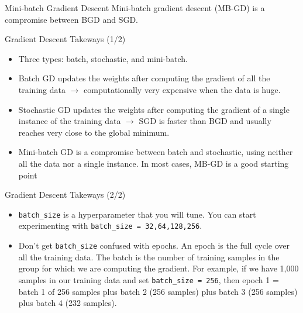 \documentclass{beamer}
\begin{document}
\begin{frame}{Mini-batch Gradient Descent}
	Mini-batch gradient descent (MB-GD) is a compromise between BGD and SGD.
\end{frame}

\begin{frame}{Gradient Descent Takeways (1/2)}
	\begin{itemize}
		\item<2-> Three types: batch, stochastic, and mini-batch.
		\item<3-> Batch GD updates the weights after computing the gradient of all the training data $\rightarrow$ computationally very expensive when the data is huge.
		\item<4-> Stochastic GD updates the weights after computing the gradient of a single instance of the training data $\rightarrow$ SGD is faster than BGD and usually reaches very close to the global minimum.
		\item<5-> Mini-batch GD is a compromise between batch and stochastic, using neither all the data nor a single instance. In most cases, MB-GD is a good starting point
	\end{itemize}
\end{frame}

\begin{frame}{Gradient Descent Takeways (2/2)}
	\begin{itemize}
		\item<2-> \texttt{batch\_size} is a hyperparameter that you will tune. You can start experimenting with \texttt{batch\_size = 32,64,128,256}.
		\item<3-> Don't get \texttt{batch\_size} confused with epochs. An epoch is the full cycle over all the training data. The batch is the number of training samples in the group for which we are computing the gradient. For example, if we have 1,000 samples in our training data and set \texttt{batch\_size = 256}, then epoch 1 = batch 1 of 256 samples plus batch 2 (256 samples) plus batch 3 (256 samples) plus batch 4 (232 samples).
	\end{itemize}
\end{frame}
\end{document}
